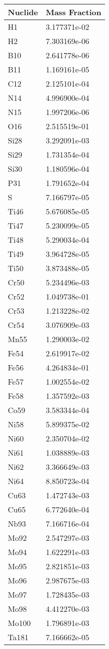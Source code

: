 \begin{centering}
\begin{longtable}[ht!]
{ p{} | p{} }
\hline
Nuclide & Mass Fraction\\
\hline
H1 & 3.177371e-02\\
H2 & 7.303169e-06\\
B10 & 2.641778e-06\\
B11 & 1.169161e-05\\
C12 & 2.125101e-04\\
N14 & 4.996900e-04\\
N15 & 1.997206e-06\\
O16 & 2.515519e-01\\
Si28 & 3.292091e-03\\
Si29 & 1.731354e-04\\
Si30 & 1.180596e-04\\
P31 & 1.791652e-04\\
S & 7.166797e-05\\
Ti46 & 5.676085e-05\\
Ti47 & 5.230099e-05\\
Ti48 & 5.290034e-04\\
Ti49 & 3.964728e-05\\
Ti50 & 3.873488e-05\\
Cr50 & 5.234496e-03\\
Cr52 & 1.049738e-01\\
Cr53 & 1.213228e-02\\
Cr54 & 3.076909e-03\\
Mn55 & 1.290003e-02\\
Fe54 & 2.619917e-02\\
Fe56 & 4.264834e-01\\
Fe57 & 1.002554e-02\\
Fe58 & 1.357592e-03\\
Co59 & 3.583344e-04\\
Ni58 & 5.899375e-02\\
Ni60 & 2.350704e-02\\
Ni61 & 1.038889e-03\\
Ni62 & 3.366649e-03\\
Ni64 & 8.850723e-04\\
Cu63 & 1.472743e-03\\
Cu65 & 6.772640e-04\\
Nb93 & 7.166716e-04\\
Mo92 & 2.547297e-03\\
Mo94 & 1.622291e-03\\
Mo95 & 2.821851e-03\\
Mo96 & 2.987675e-03\\
Mo97 & 1.728435e-03\\
Mo98 & 4.412270e-03\\
Mo100 & 1.796891e-03\\
Ta181 & 7.166662e-05\\


\end{longtable}
\end{centering}
